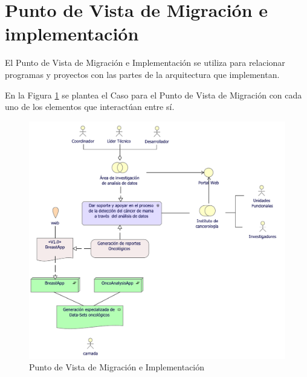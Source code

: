 \newpage
\section{Punto de Vista de Migración e implementación}
El Punto de Vista de Migración e Implementación se utiliza para relacionar programas y proyectos con las partes de la arquitectura que implementan\cite{BolanosCastro2019}. 

En la Figura \ref{PvMigraImple} se plantea el Caso para el Punto de Vista de Migración con cada uno de los elementos que interactúan entre sí. 

\begin{figure}[h!]
	\centering
	\includegraphics[width=0.92\linewidth]{ARQUITECTURA/imgs/CapaImplementacion/3_PvMigracionImplementacion}
	\caption{Punto de Vista de Migración e Implementación}
	\label{PvMigraImple}
\end{figure}

